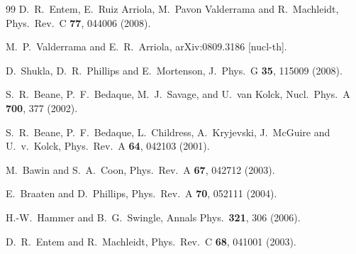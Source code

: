 \documentclass[aps,rmp,nofootinbib,twocolumn,floatfix]{revtex4}
\begin{document}
\begin{thebibliography}{99}
  D.~R.~Entem, E.~Ruiz Arriola, M.~Pavon Valderrama and R.~Machleidt,
  Phys.\ Rev.\  C {\bf 77}, 044006 (2008).

  M.~P.~Valderrama and E.~R.~Arriola,
  arXiv:0809.3186 [nucl-th].

  D.~Shukla, D.~R.~Phillips and E.~Mortenson,
  J.\ Phys.\ G {\bf 35}, 115009 (2008).

S.~R.~Beane, P.~F.~Bedaque, M.~J.~Savage, and U.~van Kolck,
Nucl.\ Phys.\ A {\bf 700}, 377 (2002).

  S.~R.~Beane, P.~F.~Bedaque, L.~Childress, A.~Kryjevski, J.~McGuire and U.~v.~Kolck,
  Phys.\ Rev.\  A {\bf 64}, 042103 (2001).

  M.~Bawin and S.~A.~Coon,
  Phys.\ Rev.\  A {\bf 67}, 042712 (2003).

  E.~Braaten and D.~Phillips,
 Phys.\ Rev.\ A {\bf 70}, 052111 (2004).

  H.-W.~Hammer and B.~G.~Swingle,
  Annals Phys.\  {\bf 321}, 306 (2006).

  D.~R.~Entem and R.~Machleidt,
  Phys.\ Rev.\  C {\bf 68}, 041001 (2003).


\end{thebibliography}
\end{document}
